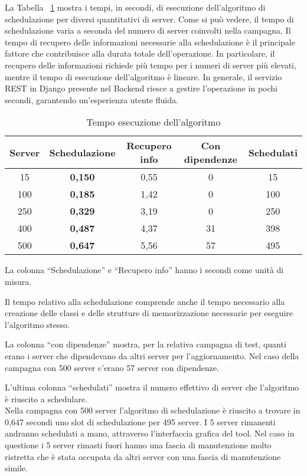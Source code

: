 La Tabella ~\ref{tab:algo-exec} mostra i tempi, in secondi, di esecuzione 
dell'algoritmo di schedulazione per diversi quantitativi di server. Come si 
può vedere, il tempo di schedulazione varia a seconda del numero di server 
coinvolti nella campagna. Il tempo di recupero delle informazioni necessarie 
alla schedulazione è il principale fattore che contribuisce alla durata 
totale dell'operazione. In particolare, 
il recupero delle informazioni richiede più tempo per i numeri di server più 
elevati, mentre il tempo di esecuzione dell'algoritmo è lineare. 
In generale, il servizio REST in Django presente nel Backend riesce a gestire 
l'operazione in pochi secondi, garantendo un'esperienza utente fluida.\\

\begin {table}[H]
\begin{center}
\begin{tabular}{|c|c|c|c|c|}
  
  \hline
  \rowcolor[gray]{.66}
  \textbf{Server} & \textbf{Schedulazione} & \textbf{Recupero info} & \textbf{Con dipendenze} & \textbf{Schedulati}\\
  
  \hline
  \rowcolor[gray]{.87}15 & \textbf{0,150} & 0,55 & 0 & 15 \\
  \rowcolor[gray]{.95}100 & \textbf{0,185} & 1,42 & 0 & 100 \\
  \rowcolor[gray]{.87}250 & \textbf{0,329} & 3,19 & 0 & 250 \\
  \rowcolor[gray]{.95}400 & \textbf{0,487} & 4,37 & 31 & 398 \\
  \rowcolor[gray]{.87}500 & \textbf{0,647} & 5,56 & 57 & 495 \\
  \hline
\end{tabular} 
\caption {Tempo esecuzione dell'algoritmo}
\label{tab:algo-exec}
La colonna “Schedulazione” e “Recupero info” hanno i secondi come unità di misura.
\end{center}
\end{table}

Il tempo relativo alla schedulazione comprende anche il tempo necessario 
alla creazione delle classi e delle strutture di memorizzazione 
necessarie per eseguire l'algoritmo stesso.


La colonna “con dipendenze” mostra, per la relativa campagna di test, quanti 
erano i server che dipendevano da altri server per l’aggiornamento. Nel caso 
della campagna con 500 server c’erano 57 server con dipendenze.

L’ultima colonna “schedulati” mostra il numero effettivo di server che 
l’algoritmo è riuscito a schedulare.\\

Nella campagna con 500 server 
l’algoritmo di schedulazione è riuscito a trovare in 0,647 secondi uno slot 
di schedulazione per 495 server. I 5 server rimanenti andranno schedulati a 
mano, attraverso l’interfaccia grafica del tool. Nel caso in questione i 5 server 
rimasti fuori hanno una fascia di manutenzione molto ristretta che è stata 
occupata da altri server con una fascia di manutenzione simile.
